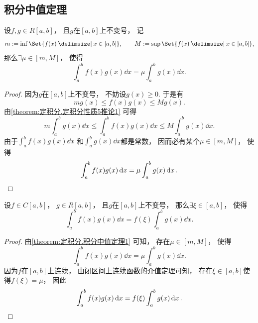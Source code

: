 \subsection{积分中值定理}
\begin{theorem}[积分第一中值定理]\label{theorem:定积分.积分中值定理1}
设\(f,g \in R[a,b]\)，
且\(g\)在\([a,b]\)上不变号，
记\begin{equation*}
	m \defeq \inf\Set{ f(x) \given x \in [a,b] }, \qquad
	M \defeq \sup\Set{ f(x) \given x \in [a,b] },
\end{equation*}
那么\(\exists\mu\in[m,M]\)，
使得\begin{equation}
	\int_a^b f(x) g(x) \dd{x} = \mu \int_a^b g(x) \dd{x}.
\end{equation}
\begin{proof}
因为\(g\)在\([a,b]\)上不变号，
不妨设\(g(x)\geq0\).
于是有\begin{equation*}
	m g(x) \leq f(x) g(x) \leq M g(x).
\end{equation*}
由\cref{theorem:定积分.定积分性质5推论1} 可得\begin{equation*}
	m \int_a^b g(x) \dd{x}
	\leq \int_a^b f(x) g(x) \dd{x}
	\leq M \int_a^b g(x) \dd{x}.
\end{equation*}
由于\(\int_a^b f(x) g(x) \dd{x}\)
和\(\int_a^b g(x) \dd{x}\)都是常数，
因而必有某个\(\mu\in[m,M]\)，
使得\begin{equation*}
	\int_a^b f(x) g(x) \dd{x}
	= \mu \int_a^b g(x) \dd{x}.
	\qedhere
\end{equation*}
\end{proof}
\end{theorem}

\begin{corollary}\label{theorem:定积分.积分中值定理1推论1}
设\(f \in C[a,b]\)，
\(g \in R[a,b]\)，
且\(g\)在\([a,b]\)上不变号，
那么\(\exists\xi\in[a,b]\)，
使得\begin{equation}
	\int_a^b f(x) g(x) \dd{x}
	= f(\xi) \int_a^b g(x) \dd{x}.
\end{equation}
\begin{proof}
由\cref{theorem:定积分.积分中值定理1} 可知，
存在\(\mu\in[m,M]\)，
使得\begin{equation*}
	\int_a^b f(x) g(x) \dd{x}
	= \mu \int_a^b g(x) \dd{x}.
\end{equation*}
因为\(f\)在\([a,b]\)上连续，
由\hyperref[theorem:极限.闭区间上连续函数的性质.介值定理2]{闭区间上连续函数的介值定理}可知，
存在\(\xi\in[a,b]\)使得\(f(\xi) = \mu\)，
因此\begin{equation*}
	\int_a^b f(x) g(x) \dd{x}
	= f(\xi) \int_a^b g(x) \dd{x}.
	\qedhere
\end{equation*}
\end{proof}
\end{corollary}

